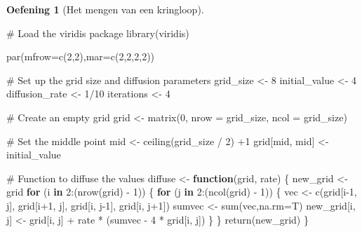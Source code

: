 \documentclass[
  a4paper,
]{scrbook}
\newenvironment{Shaded}{\begin{snugshade}}{\end{snugshade}}
\newcommand{\AttributeTok}[1]{\textcolor[rgb]{0.40,0.45,0.13}{#1}}
\newcommand{\CommentTok}[1]{\textcolor[rgb]{0.37,0.37,0.37}{#1}}
\newcommand{\ControlFlowTok}[1]{\textcolor[rgb]{0.00,0.23,0.31}{\textbf{#1}}}
\newcommand{\DecValTok}[1]{\textcolor[rgb]{0.68,0.00,0.00}{#1}}
\newcommand{\FunctionTok}[1]{\textcolor[rgb]{0.28,0.35,0.67}{#1}}
\newcommand{\NormalTok}[1]{\textcolor[rgb]{0.00,0.23,0.31}{#1}}
\newcommand{\OtherTok}[1]{\textcolor[rgb]{0.00,0.23,0.31}{#1}}
\newcommand{\SpecialCharTok}[1]{\textcolor[rgb]{0.37,0.37,0.37}{#1}}
\theoremstyle{definition}
\newtheorem{exercise}{Oefening}[chapter]
\theoremstyle{remark}
\begin{document}
\begin{exercise}[Het mengen van een
kringloop]
\begin{Shaded}
\begin{Highlighting}[]
\CommentTok{\# Load the viridis package}
\FunctionTok{library}\NormalTok{(viridis)}

\FunctionTok{par}\NormalTok{(}\AttributeTok{mfrow=}\FunctionTok{c}\NormalTok{(}\DecValTok{2}\NormalTok{,}\DecValTok{2}\NormalTok{),}\AttributeTok{mar=}\FunctionTok{c}\NormalTok{(}\DecValTok{2}\NormalTok{,}\DecValTok{2}\NormalTok{,}\DecValTok{2}\NormalTok{,}\DecValTok{2}\NormalTok{))}

\CommentTok{\# Set up the grid size and diffusion parameters}
\NormalTok{grid\_size }\OtherTok{\textless{}{-}} \DecValTok{8}
\NormalTok{initial\_value }\OtherTok{\textless{}{-}} \DecValTok{4}
\NormalTok{diffusion\_rate }\OtherTok{\textless{}{-}} \DecValTok{1}\SpecialCharTok{/}\DecValTok{10}
\NormalTok{iterations }\OtherTok{\textless{}{-}} \DecValTok{4}

\CommentTok{\# Create an empty grid}
\NormalTok{grid }\OtherTok{\textless{}{-}} \FunctionTok{matrix}\NormalTok{(}\DecValTok{0}\NormalTok{, }\AttributeTok{nrow =}\NormalTok{ grid\_size, }\AttributeTok{ncol =}\NormalTok{ grid\_size)}

\CommentTok{\# Set the middle point}
\NormalTok{mid }\OtherTok{\textless{}{-}} \FunctionTok{ceiling}\NormalTok{(grid\_size }\SpecialCharTok{/} \DecValTok{2}\NormalTok{) }\SpecialCharTok{+}\DecValTok{1}
\NormalTok{grid[mid, mid] }\OtherTok{\textless{}{-}}\NormalTok{ initial\_value}

\CommentTok{\# Function to diffuse the values}
\NormalTok{diffuse }\OtherTok{\textless{}{-}} \ControlFlowTok{function}\NormalTok{(grid, rate) \{}
\NormalTok{  new\_grid }\OtherTok{\textless{}{-}}\NormalTok{ grid}
  \ControlFlowTok{for}\NormalTok{ (i }\ControlFlowTok{in} \DecValTok{2}\SpecialCharTok{:}\NormalTok{(}\FunctionTok{nrow}\NormalTok{(grid) }\SpecialCharTok{{-}} \DecValTok{1}\NormalTok{)) \{}
    \ControlFlowTok{for}\NormalTok{ (j }\ControlFlowTok{in} \DecValTok{2}\SpecialCharTok{:}\NormalTok{(}\FunctionTok{ncol}\NormalTok{(grid) }\SpecialCharTok{{-}} \DecValTok{1}\NormalTok{)) \{}
\NormalTok{      vec }\OtherTok{\textless{}{-}} \FunctionTok{c}\NormalTok{(grid[i}\DecValTok{{-}1}\NormalTok{, j], grid[i}\SpecialCharTok{+}\DecValTok{1}\NormalTok{, j], grid[i, j}\DecValTok{{-}1}\NormalTok{], grid[i, j}\SpecialCharTok{+}\DecValTok{1}\NormalTok{])}
\NormalTok{      sumvec }\OtherTok{\textless{}{-}} \FunctionTok{sum}\NormalTok{(vec,}\AttributeTok{na.rm=}\NormalTok{T)}
\NormalTok{      new\_grid[i, j] }\OtherTok{\textless{}{-}}\NormalTok{ grid[i, j] }\SpecialCharTok{+} 
\NormalTok{        rate }\SpecialCharTok{*}\NormalTok{ (sumvec }\SpecialCharTok{{-}} \DecValTok{4} \SpecialCharTok{*}\NormalTok{ grid[i, j])}
\NormalTok{    \}}
\NormalTok{  \}}
  \FunctionTok{return}\NormalTok{(new\_grid)}
\NormalTok{\}}


\end{Highlighting}
\end{Shaded}
\end{exercise}
\end{document}
